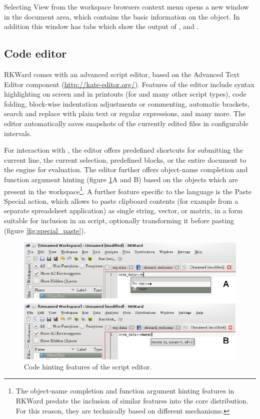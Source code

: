 Selecting View from the workspace
browsers context menu opens a new window in the
document area, which contains the basic information on the object. In
addition this window has tabs which show the output of
, and .

\subsection{Code editor}
\label{sec:code_editor}

RKWard comes with an advanced
 script editor, based on the
 Advanced Text Editor component
(\url{http://kate-editor.org/}). Features of the
editor include syntax highlighting on screen and in printouts (for
 and many other script types), code
folding, block-wise indentation adjustments or commenting, automatic
brackets, search and replace with plain text or regular expressions,
and many more. The editor automatically saves snapshots of the
currently edited files in configurable intervals.

For interaction with , the editor offers
predefined shortcuts for submitting the current line, the current
selection, predefined blocks, or the entire document to the
 engine for evaluation. The editor further
offers object-name completion and function argument hinting (figure
\ref{fig:code_hinting}A and B) based on the objects which are present in
the  workspace\footnote{The object-name
completion and function argument hinting features in RKWard predate the
inclusion of similar features into the core
 distribution. For this reason, they are
technically based on different mechanisms.}. A further feature specific
to the  language is the
Paste Special action, which allows to
paste clipboard contents (for example from a separate spreadsheet
application) as single string, vector, or matrix, in a form suitable
for inclusion in an  script, optionally
transforming it before pasting (figure \ref{fig:special_paste}).

\begin{figure}[htp]
 \centering
 \includegraphics{../figures/code_hinting.png}
 \caption{Code hinting features of the script editor.}
 \label{fig:code_hinting}
\end{figure}

